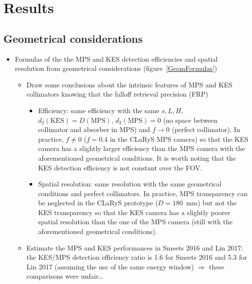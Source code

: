 \documentclass[a4paper,english]{article}
\begin{document}


\section{Results}

\subsection{Geometrical considerations}

\begin{itemize}
  \item Formulas of the the MPS and KES detection efficiencies and spatial resolution from geometrical considerations (figure~\ref{GeomFormulas})
  \begin{itemize}
    \item Draw some conclusions about the intrinsic features of MPS and KES collimators knowing that the falloff retrieval precision (FRP)   
    \begin{itemize}
      \item Efficiency: same efficiency with the same $s, L, H$, $d_2(\text{KES}) = D(\text{MPS})$, $d_2(\text{MPS})=0$ (no space between collimator and absorber in MPS) and $f\longrightarrow0$ (perfect collimator). In practice, $f\ne 0$ ($f=0.4$ in the CLaRyS MPS camera) so that the KES camera has a slightly larger efficiency than the MPS camera with the aforementioned geometrical conditions. It is worth noting that the KES detection efficiency is not constant over the FOV.
      \item Spatial resolution: same resolution with the same geometrical conditions and perfect collimators. In practice, MPS transparency can be neglected in the CLaRyS prototype ($D = 180$~mm) but not the KES transparency so that the KES camera has a slightly poorer spatial resolution than the one of the MPS camera (still with the aforementioned geometrical conditions).
    \end{itemize}       
    \item Estimate the MPS and KES performances in Smeets 2016 and Lin 2017: the KES/MPS detection efficiency ratio is 1.6 for Smeets 2016 and 5.3 for Lin 2017 (assuming the use of the same energy window) $\Rightarrow$ these comparisons were unfair\dots   
  \end{itemize}
\end{itemize}
\end{document}
